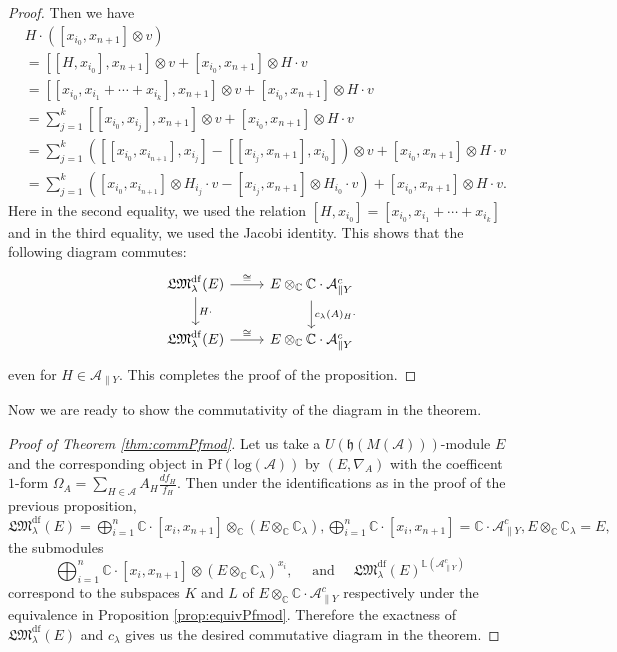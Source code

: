 \documentclass[a4paper,12pt]{article}
\theoremstyle{definition}
\theoremstyle{remark}
\begin{document}
\begin{proof}
Then we have 
\begin{align*}
	&H\cdot ([x_{i_{0}},x_{n+1}]\otimes v)\\
	&=[[H,x_{i_{0}}],x_{n+1}]\otimes v+[x_{i_{0}},x_{n+1}]\otimes H\cdot v\\
	&=[[x_{i_{0}},x_{i_{1}}+\cdots +x_{i_{k}}],x_{n+1}]\otimes v+[x_{i_{0}},x_{n+1}]\otimes H\cdot v\\
	&=\sum_{j=1}^{k}[[x_{i_{0}},x_{i_{j}}],x_{n+1}]\otimes v+[x_{i_{0}},x_{n+1}]\otimes H\cdot v\\
	&=\sum_{j=1}^{k}
	\left(
		[[x_{i_{0}},x_{i_{n+1}}],x_{i_{j}}]-[[x_{i_{j}},x_{n+1}],x_{i_{0}}]
	\right)\otimes v+[x_{i_{0}},x_{n+1}]\otimes H\cdot v\\
	&=
	\sum_{j=1}^{k}
	\left(
		[x_{i_{0}},x_{i_{n+1}}]\otimes H_{i_{j}}\cdot v
		-[x_{i_{j}},x_{n+1}]\otimes H_{i_{0}}\cdot v
	\right)+[x_{i_{0}},x_{n+1}]\otimes H\cdot v.
\end{align*}
Here in the second equality, we used the relation $[H,x_{i_{0}}]=[x_{i_{0}},x_{i_{1}}+\cdots +x_{i_{k}}]$ 
and in the third equality, we used the Jacobi identity.
This shows that the following diagram commutes:
\[
	\begin{tikzcd}
	\mathfrak{LM}^{\mathrm{df}}_{\lambda}(E)\arrow[r,"\cong"]\arrow[d,"H\cdot"]&
	E\otimes_{\mathbb{C}}\mathbb{C}\cdot \mathcal{A}_{\parallel Y}^{c}\arrow[d,"c_{\lambda}(A)_{H}\cdot"]\\
	\mathfrak{LM}^{\mathrm{df}}_{\lambda}(E)\arrow[r,"\cong"]&
	E\otimes_{\mathbb{C}}\mathbb{C}\cdot \mathcal{A}_{\parallel Y}^{c}
	\end{tikzcd}
\]
even for $H\in \mathcal{A}_{\parallel Y}$.
This completes the proof of the proposition.
\end{proof}
Now we are ready to show the commutativity of the diagram in the theorem.
\begin{proof}[Proof of Theorem \ref{thm:commPfmod}]
Let us take a $U(\mathfrak{h}(M(\mathcal{A})))$-module $E$ and 
the corresponding object in $\mathrm{Pf}(\mathrm{log}(\mathcal{A}))$ by $(E, \nabla_A)$
with the coefficent $1$-form
$\Omega_{A}=\sum_{H\in \mathcal{A}}A_{H}\frac{d f_{H}}{f_{H}}$.
Then under the identifications as in the proof of the previous proposition, 
$\mathfrak{LM}_{\lambda}^{\mathrm{df}}(E)=\bigoplus_{i=1}^{n}\mathbb{C}\cdot [x_{i},x_{n+1}]\otimes_{\mathbb{C}}(E\otimes_{\mathbb{C}}\mathbb{C}_{\lambda}),
	\bigoplus_{i=1}^{n}\mathbb{C}\cdot [x_{i},x_{n+1}]=\mathbb{C}\cdot \mathcal{A}_{\parallel Y}^{c},
	E\otimes_{\mathbb{C}}\mathbb{C}_{\lambda}=E,
$
the submodules 
\[
	\bigoplus_{i=1}^{n}\mathbb{C}\cdot [x_{i},x_{n+1}]\otimes (E\otimes_{\mathbb{C}}\mathbb{C}_{\lambda})^{x_{i}},\quad
	\text{ and }\quad
	\mathfrak{LM}_{\lambda}^{\mathrm{df}}(E)^{\mathbb{L}(\mathcal{A}_{\parallel Y}^{c})}
\]
correspond to the subspaces $K$ and $L$ of $E\otimes_{\mathbb{C}}\mathbb{C}\cdot \mathcal{A}_{\parallel Y}^{c}$ respectively
under the equivalence in Proposition \ref{prop:equivPfmod}.
Therefore the exactness of $\mathfrak{LM}_{\lambda}^{\mathrm{df}}(E)$ and $c_{\lambda}$
gives us the desired commutative diagram in the theorem.
\end{proof}	
\end{document}
